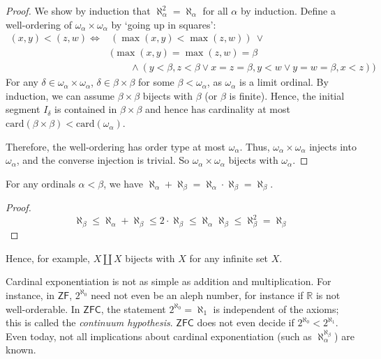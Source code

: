\begin{proof}
    We show by induction that \( \aleph_\alpha^2 = \aleph_\alpha \) for all \( \alpha \) by induction.
    Define a well-ordering of \( \omega_\alpha \times \omega_\alpha \) by `going up in squares':
    \begin{align*}
        (x,y) < (z,w) \iff &(\max(x,y) < \max(z,w)) \ \vee \\
        &(\max(x,y) = \max(z,w) = \beta \\
        &\quad\quad\wedge (y < \beta, z < \beta \vee x = z = \beta, y < w \vee y = w = \beta, x < z))
    \end{align*}
    For any \( \delta \in \omega_\alpha \times \omega_\alpha \), \( \delta \in \beta \times \beta \) for some \( \beta < \omega_\alpha \), as \( \omega_\alpha \) is a limit ordinal.
    By induction, we can assume \( \beta \times \beta \) bijects with \( \beta \) (or \( \beta \) is finite).
    Hence, the initial segment \( I_\delta \) is contained in \( \beta \times \beta \) and hence has cardinality at most \( \mathrm{card}(\beta \times \beta) < \mathrm{card}(\omega_\alpha) \).

    Therefore, the well-ordering has order type at most \( \omega_\alpha \).
    Thus, \( \omega_\alpha \times \omega_\alpha \) injects into \( \omega_\alpha \), and the converse injection is trivial.
    So \( \omega_\alpha \times \omega_\alpha \) bijects with \( \omega_\alpha \).
\end{proof}
\begin{corollary}
    For any ordinals \( \alpha < \beta \), we have \( \aleph_\alpha + \aleph_\beta = \aleph_\alpha \cdot \aleph_\beta = \aleph_\beta \).
\end{corollary}
\begin{proof}
    \[ \aleph_\beta \leq \aleph_\alpha + \aleph_\beta \leq 2 \cdot \aleph_\beta \leq \aleph_\alpha \aleph_\beta \leq \aleph_\beta^2 = \aleph_\beta \]
\end{proof}
Hence, for example, \( X \amalg X \) bijects with \( X \) for any infinite set \( X \).

Cardinal exponentiation is not as simple as addition and multiplication.
For instance, in \( \mathsf{ZF} \), \( 2^{\aleph_0} \) need not even be an aleph number, for instance if \( \mathbb R \) is not well-orderable.
In \( \mathsf{ZFC} \), the statement \( 2^{\aleph_0} = \aleph_1 \) is independent of the axioms; this is called the \emph{continuum hypothesis}.
\( \mathsf{ZFC} \) does not even decide if \( 2^{\aleph_0} < 2^{\aleph_1} \).
Even today, not all implications about cardinal exponentiation (such as \( \aleph_\alpha^{\aleph_\beta} \)) are known.
